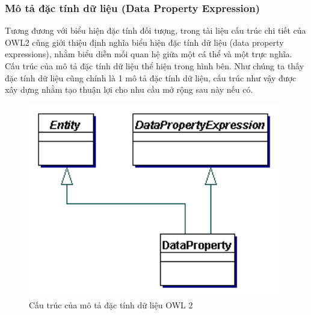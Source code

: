 \subsubsection{Mô tả đặc tính dữ liệu (Data Property Expression)}
Tương đương với biểu hiện đặc tính đối tượng, trong tài liệu cấu trúc chi tiết của OWL2 cũng giới thiệu định nghĩa biểu hiện đặc tính dữ liệu  (data property expressions), nhằm biểu diễn mối quan hệ giữa một cá thể và một trực nghĩa. Cấu trúc của mô tả đặc tính dữ liệu thể hiện trong hình bên. Như chúng ta thấy đặc tính dữ liệu cũng chính là 1 mô tả đặc tính dữ liệu, cấu trúc như vậy được xây dựng nhằm tạo thuận lợi cho nhu cầu mở rộng sau này nếu có.
\begin{figure}[h!]
	\centering
	\includegraphics[width=110mm]{Figures/data_property_expression.png}
	\caption{Cấu trúc của mô tả đặc tính dữ liệu OWL 2\label{overflow}}
\end{figure}

